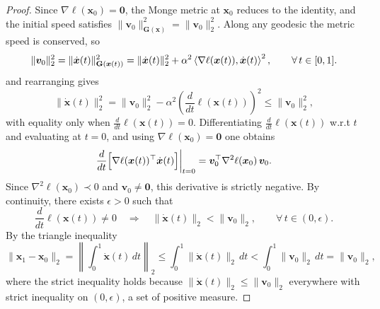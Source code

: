 \begin{proof}
Since $\nabla\ell(\boldsymbol{x}_0) = \boldsymbol{0}$, the Monge metric at $\boldsymbol{x}_0$ reduces 
to the identity, and the initial speed satisfies $\|\boldsymbol{v}_0\|_{\mathbf{G}(\boldsymbol{x})}^2 = \|\boldsymbol{v}_0\|_2^2$.
Along any geodesic the metric speed is conserved, so
\begin{equation*}
    \|\boldsymbol{v}_0\|^2_2=\|\dot{\boldsymbol{x}}(t)\|^2_{\mathbf{G}(\boldsymbol{x}(t))}  = \|\dot{\boldsymbol{x}}(t)\|_2^2 + \alpha^2
    \left\langle \nabla\ell(\boldsymbol{x}(t)), \dot{\boldsymbol{x}}(t) \right\rangle^2    
    , \qquad \forall\, t\in[0,1].
\end{equation*}
and rearranging gives
\begin{equation*}
    \|\dot{\boldsymbol{x}}(t)\|_2^2 
    = \|\boldsymbol{v}_0\|_2^2 - \alpha^2\!\left(\frac{d}{dt}\ell(\boldsymbol{x}(t))\right)^{\!2} 
    \leq \|\boldsymbol{v}_0\|_2^2,
\end{equation*}
with equality only when $\frac{d}{dt}\ell(\boldsymbol{x}(t)) = 0$.
Differentiating $\frac{d}{dt}\ell(\boldsymbol{x}(t))$ w.r.t $t$
and evaluating at $t=0$, and using $\nabla\ell(\boldsymbol{x}_0)=\boldsymbol{0}$ one obtains
\begin{equation*}
    \frac{d}{dt}\Bigl[\nabla\ell(\boldsymbol{x}(t))^\top\dot{\boldsymbol{x}}(t)\Bigr]\bigg|_{t=0}
    = \boldsymbol{v}_0^\top\nabla^2\ell(\boldsymbol{x}_0)\,\boldsymbol{v}_0.
\end{equation*}
Since $\nabla^2\ell(\boldsymbol{x}_0)\prec 0$ and $\boldsymbol{v}_0\neq\boldsymbol{0}$, this 
derivative is strictly negative. By continuity, there exists $\epsilon > 0$ such that
\begin{equation*}
    \frac{d}{dt}\ell(\boldsymbol{x}(t)) \neq 0 
    \quad\Longrightarrow\quad 
    \|\dot{\boldsymbol{x}}(t)\|_2 < \|\boldsymbol{v}_0\|_2, 
    \qquad \forall\, t\in(0,\epsilon).
\end{equation*}
By the triangle inequality
\begin{equation*}
    \|\boldsymbol{x}_1 - \boldsymbol{x}_0\|_2 
    = \left\|\int_0^1 \dot{\boldsymbol{x}}(t)\,dt\right\|_2 
    \leq \int_0^1\|\dot{\boldsymbol{x}}(t)\|_2\,dt 
    < \int_0^1\|\boldsymbol{v}_0\|_2\,dt 
    = \|\boldsymbol{v}_0\|_2,
\end{equation*}
where the strict inequality holds because $\|\dot{\boldsymbol{x}}(t)\|_2 \leq \|\boldsymbol{v}_0\|_2$ 
everywhere with strict inequality on $(0, \epsilon)$, a set of positive measure.
\end{proof}


